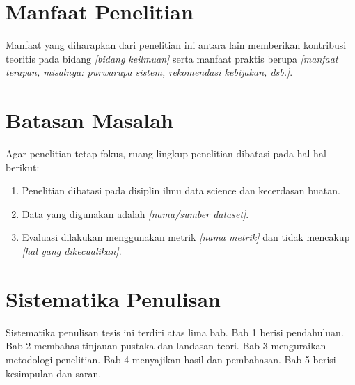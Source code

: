 \section{Manfaat Penelitian}
Manfaat yang diharapkan dari penelitian ini antara lain memberikan kontribusi teoritis pada bidang \textit{[bidang keilmuan]} serta manfaat praktis berupa \textit{[manfaat terapan, misalnya: purwarupa sistem, rekomendasi kebijakan, dsb.]}.

\section{Batasan Masalah}
Agar penelitian tetap fokus, ruang lingkup penelitian dibatasi pada hal-hal berikut:
\begin{enumerate}
    \item Penelitian dibatasi pada disiplin ilmu data science dan kecerdasan buatan.
    \item Data yang digunakan adalah \textit{[nama/sumber dataset]}.
    \item Evaluasi dilakukan menggunakan metrik \textit{[nama metrik]} dan tidak mencakup \textit{[hal yang dikecualikan]}.
\end{enumerate}

\section{Sistematika Penulisan}
Sistematika penulisan tesis ini terdiri atas lima bab. Bab 1 berisi pendahuluan. Bab 2 membahas tinjauan pustaka dan landasan teori. Bab 3 menguraikan metodologi penelitian. Bab 4 menyajikan hasil dan pembahasan. Bab 5 berisi kesimpulan dan saran.
